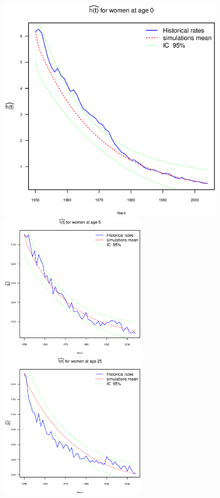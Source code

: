 \documentclass[smallextended]{svjour3}
\begin{document}
\begin{figure}[t]
    \includegraphics[scale= 0.5, keepaspectratio]{PlotWomen0.eps}
    \includegraphics[width = 2.85in]{PlotWomen5.eps}
    \includegraphics[width = 2.85in]{PlotWomen25.eps}

\end{figure}
\end{document}
